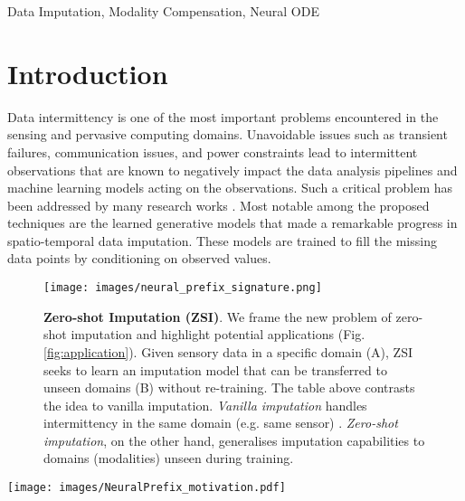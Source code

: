 \documentclass[10pt, conference, compsocconf]{IEEEtran}
\def\update#1{#1}
\begin{document}
\begin{IEEEkeywords}
 Data Imputation, Modality Compensation, Neural ODE
\end{IEEEkeywords}
  
\maketitle

\section{Introduction}

Data intermittency is one of the most important problems encountered in the sensing and pervasive computing domains. Unavoidable issues such as transient failures, communication issues, and power constraints lead to intermittent observations that are known to negatively impact the data analysis pipelines and machine learning models acting on the observations. Such a critical problem has been addressed by many research works \cite{adhikari2022comprehensive}.  Most notable among the proposed techniques are the learned generative models \cite{gao2022generative} that made a remarkable progress in spatio-temporal data imputation. These models \cite{yuan2022stgan} are trained to fill the missing data points by conditioning on observed values.


\begin{figure}[th]
    \centering
    \texttt{[image: images/neural\_prefix\_signature.png]}
    \caption{\textbf{Zero-shot Imputation (ZSI)}. We frame the new problem of zero-shot imputation and highlight potential applications (Fig. \ref{fig:application}). Given \update{sensory data} in a specific domain (A), ZSI seeks to learn an imputation model that can be transferred to unseen domains (B) without re-training. The table above contrasts the idea to vanilla imputation. \textit{Vanilla imputation} handles intermittency in \update{the} same domain (e.g. same sensor) . 
    \textit{Zero-shot imputation}, on the other hand, generalises imputation capabilities to domains (modalities) unseen during training.  
    }
 \label{fig:signature}
 \vspace{-1em}
\end{figure}



\begin{figure*}[t!]
\centering
  \texttt{[image: images/NeuralPrefix\_motivation.pdf]}
  \caption{\textbf{Example application of Zero-shot Impuation}. (Left) A hazard perception suit encompasses several wearable sensors, such as on-chip radars, to sense the ambience and inform/warn the wearer of important events, including quickly falling objects or approaching vehicles. Intermittency (e.g. transient sensor failure) can result in missing those events and hence dangerous consequences.  (Right) NeuralPrefix can preface the existing model to reconstruct the complete signal \underline{in a zero-shot manner} (i.e. generalising to unseen modalities).  It doesn’t require modifying either the sensor's operational cycle (on/off schedule) or the underlying ML model.}
  \label{fig:application}
\end{figure*}
\end{document}
